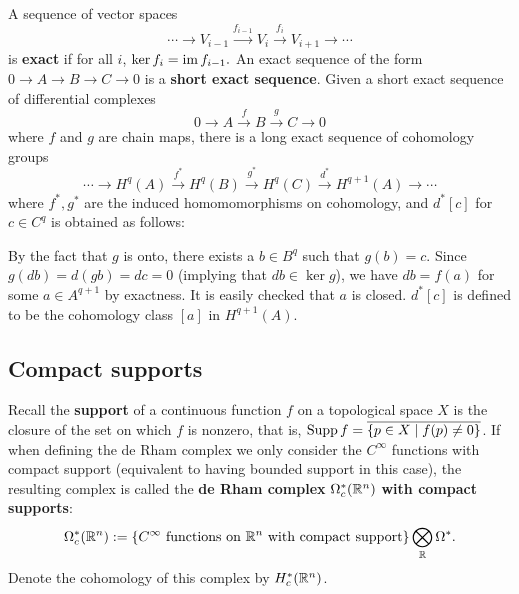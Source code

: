 A sequence of vector spaces \[
\cdots \longrightarrow V_{i-1}\overset{f_{i-1}}{\longrightarrow} V_i \overset{f_i }{\longrightarrow} V_{i+1}\longrightarrow\cdots 
\] is \textbf{exact} if for all $i$, $\ker f_i =\operatorname{im} f_{i-1}.$ An exact sequence of the form $0 \to A\to B\to C\to 0$ is a \textbf{short exact sequence}. Given a short exact sequence of differential complexes \[
0 \longrightarrow A \overset{f}{\longrightarrow } B \overset{g}{\longrightarrow } C\longrightarrow 0
\] where $f$ and $g$ are chain maps, there is a long exact sequence of cohomology groups \[
\cdots \to H^q(A) \overset{f^*}{\longrightarrow} H^q(B) \overset{g^*}{\longrightarrow} H^q(C) \overset{d^*}{\longrightarrow} H^{q+1}(A)\to \cdots 
\] where $f^*,g^*$ are the induced homomomorphisms on cohomology, and $d^*[c]$ for $c \in C^q$ is obtained as follows:
\begin{figure}[H]
\centering
{}
\end{figure}
By the fact that $g$ is onto, there exists a $b\in B^q$ such that $g(b)=c$. Since $g(db)=d(gb)=dc=0$ (implying that $db \in \ker g$), we have $db=f(a)$ for some $a \in A^{q+1}$ by exactness. It is easily checked that $a$ is closed. $d^*[c]$ is defined to be the cohomology class $[a]$ in $H^{q+1}(A)$. 

\subsection{Compact supports}
Recall the \textbf{support} of a continuous function $f$ on a topological space $X$ is the closure of the set on which $f$ is nonzero, that is, $\operatorname{Supp} f= \overline{\{p \in X\mid f(p)\neq 0\} }$. If when defining the de Rham complex we only consider the $C^{\infty}$ functions with compact support (equivalent to having bounded support in this case), the resulting complex is called the \textbf{de Rham complex} $\Omega_c^*(\mathbb{R}^n )$ \textbf{with compact supports}: 
\[
    \Omega_c^*(\R^n ):= \{C^{\infty} \ \text{functions on} \ \R^n \ \text{with compact support}  \} \bigotimes _{\R}\Omega^*.
\] Denote the cohomology of this complex by $H_c^*(\mathbb{R}^n )$.

